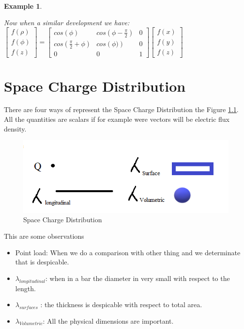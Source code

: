 \documentclass[12pt,letterpaper]{book}
\newtheorem{example}{Example}[section]
\begin{document}
\begin{example}
\begin{multicols}{2}
Now when a similar development we have:\\
$
\left[\begin{array}{c}
f(\rho )\\
f(\phi )\\
f(z)
\end{array}\right]
=
\left[\begin{array}{ccc}
cos(\phi )	&	cos\left(\phi -\frac{\pi }{2}\right)	&	0\\
cos\left(\frac{\pi }{2}+\phi \right)	&	cos\left(\phi )\right)	&	0\\
0 & 0 & 1
\end{array}\right]
\left[\begin{array}{c}
f(x)\\
f(y)\\
f(z)
\end{array}\right]
$\\

\end{multicols}

\end{example}


\chapter{Space Charge Distribution}

There are four ways of represent the Space Charge Distribution the Figure \ref{chargeDistribution}. All the quantities are scalars if for example were vectors will be electric flux density.   

\begin{figure}[H]
\centering
\includegraphics[width=.5\linewidth]{figures/chargeDistribution.png}
\caption{Space Charge Distribution}
\label{chargeDistribution}
\end{figure}

This are some observations
\begin{itemize}
\item Point load: When we do a comparison with other thing and we determinate that is despicable.
\item $\lambda _{longitudinal}$: when in a bar the diameter in very small with respect to the length.
\item $\lambda _{surfaces}$ : the thickness is despicable with respect to total area.
\item $\lambda _{Volumetric}$: All the physical dimensions are important.
\end{itemize}
\end{document}
